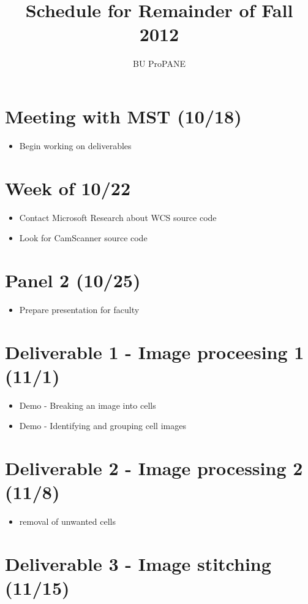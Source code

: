 \documentclass[]{article}
\begin{document}
\title{\textbf{Schedule for Remainder of Fall 2012}}
\author{BU ProPANE}
\date{}
\maketitle
	
	\thispagestyle{empty}
	\section*{Meeting with MST (10/18)}
	\begin{itemize}
	\item{Begin working on deliverables}
	\end{itemize}
	\section*{Week of 10/22}
	\begin{itemize}
		\item{Contact Microsoft Research about WCS source code}
		\item{Look for CamScanner source code}
	\end{itemize}
	\section*{Panel 2 (10/25)}
		\begin{itemize}
		\item{Prepare presentation for faculty}
	\end{itemize}
	\section*{Deliverable 1 - Image proceesing 1 (11/1)}
	\begin{itemize}
	\item{Demo - Breaking an image into cells}
	\item{Demo - Identifying and grouping cell images}
	\end{itemize}
	\section*{Deliverable 2 - Image processing 2 (11/8)}
	\begin{itemize}
		\item{removal of unwanted cells}
	\end{itemize}
	\section*{Deliverable 3 - Image stitching (11/15)}
\end{document}
